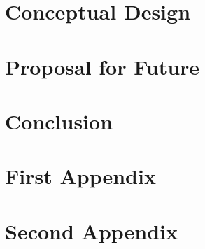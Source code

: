 \documentclass[letterpaper,12pt]{article}
\begin{document}
\section{Conceptual Design}\label{sec:design}
\lipsum[13-18]
\section{Proposal for Future}\label{sec:proposal}
\lipsum[19-20]
\section{Conclusion}\label{sec:conc}
\lipsum[21]

\clearpage

\appendix
\appendixpage
{}
\startcontents[sections]
\clearpage

\section{First Appendix}\label{app:first}
\lipsum
\clearpage

\section{Second Appendix}\label{app:second}
\lipsum
\clearpage
\end{document}
